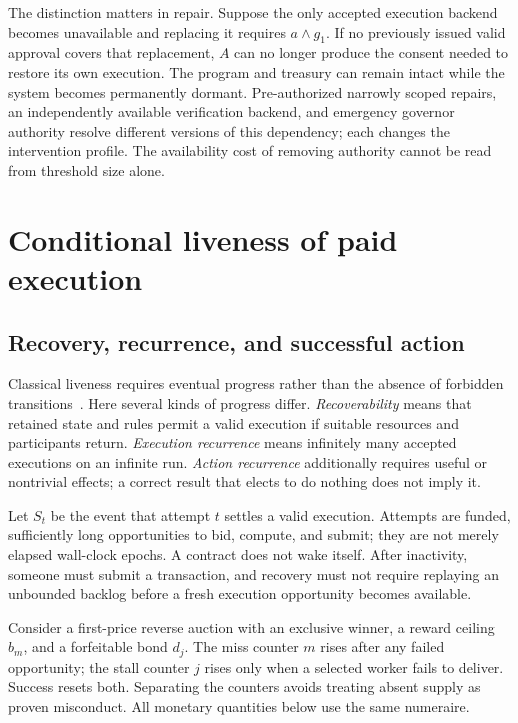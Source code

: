 \documentclass[10pt,letterpaper]{article}
\begin{document}
The distinction matters in repair. Suppose the only accepted execution backend becomes unavailable and replacing it requires $a\land g_1$. If no previously issued valid approval covers that replacement, $A$ can no longer produce the consent needed to restore its own execution. The program and treasury can remain intact while the system becomes permanently dormant. Pre-authorized narrowly scoped repairs, an independently available verification backend, and emergency governor authority resolve different versions of this dependency; each changes the intervention profile. The availability cost of removing authority cannot be read from threshold size alone.

\section{Conditional liveness of paid execution}
\label{sec:liveness}
\subsection{Recovery, recurrence, and successful action}
Classical liveness requires eventual progress rather than the absence of forbidden transitions~\citep{alpern1985}. Here several kinds of progress differ. \emph{Recoverability} means that retained state and rules permit a valid execution if suitable resources and participants return. \emph{Execution recurrence} means infinitely many accepted executions on an infinite run. \emph{Action recurrence} additionally requires useful or nontrivial effects; a correct result that elects to do nothing does not imply it.

Let $S_t$ be the event that attempt $t$ settles a valid execution. Attempts are funded, sufficiently long opportunities to bid, compute, and submit; they are not merely elapsed wall-clock epochs. A contract does not wake itself. After inactivity, someone must submit a transaction, and recovery must not require replaying an unbounded backlog before a fresh execution opportunity becomes available.

Consider a first-price reverse auction with an exclusive winner, a reward ceiling $b_m$, and a forfeitable bond $d_j$. The miss counter $m$ rises after any failed opportunity; the stall counter $j$ rises only when a selected worker fails to deliver. Success resets both. Separating the counters avoids treating absent supply as proven misconduct. All monetary quantities below use the same numeraire.
\end{document}
